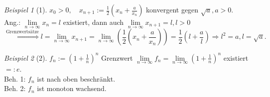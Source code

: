 \documentclass[12pt,a4paper,titlepage]{article} %
\theoremstyle{definition}
\theoremstyle{remark}
\newtheorem*{bsp}{Beispiel}
\newcommand{\limes}[1]{\lim\limits_{#1\rightarrow\infty}}
\begin{document}
\begin{bsp}[1]
	\(x_0 > 0, \quad x_{n+1} := \frac{1}{2} \left( x_n + \frac{a}{x_n} \right) \) konvergent gegen \(\sqrt{a}, a>0 \).\\
	Ang.: \( \limes{n} x_n = l \) existiert, dann auch \( \limes{n} x_{n+1} = l, l>0 \)
	\[ \overset{\text{Grenzwertsätze}}{\Longrightarrow} l = \limes{n} x_{n+1} = \limes{n} \left( \frac{1}{2} \left(x_n + \frac{a}{x_n} \right) \right) = \frac{1}{2} \left( l + \frac{a}{l} \right) \Rightarrow l^2 = a, l = \sqrt{a}. \]
\end{bsp}
\begin{bsp}[2]
	\(f_n := \left( 1 + \frac{1}{n} \right)^n \) Grenzwert \( \limes{n} f_n = \limes{n} \left( 1 + \frac{1}{n} \right)^n \) existiert \( =: e \).\\
	Beh. 1: \( f_n\) ist nach oben beschränkt.\\
	Beh. 2: \( f_n\) ist monoton wachsend.
\end{bsp}
\end{document}
